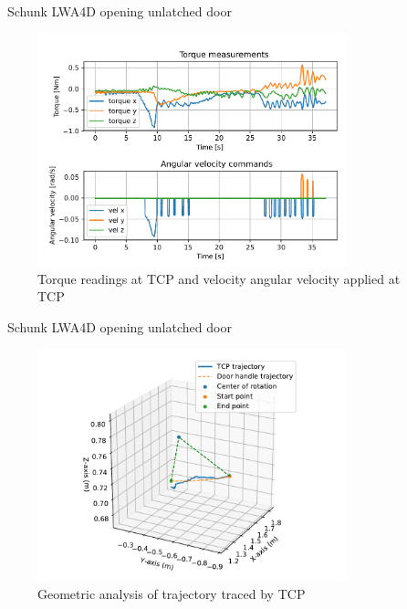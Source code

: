 \documentclass[aspectratio=43,10pt,fleqn,t]{beamer}
\begin{document}
\begin{frame}{~}{\small Schunk LWA4D opening unlatched door}
	\vspace{-1cm}
	\begin{figure}[t]
		\centering
		\includegraphics[width=0.8\textwidth]{images/exp/t-wn.pdf}
		\caption{Torque readings at TCP and velocity angular velocity applied at TCP}
		\label{EX:t-w}
	\end{figure}
\end{frame}

\begin{frame}{~}{\small Schunk LWA4D opening unlatched door}
	\vspace{-1cm}
	\begin{figure}[t]
		\centering
		\includegraphics[width=0.8\textwidth]{images/exp/traj.pdf}
		\caption{Geometric analysis of trajectory traced by TCP}
		\label{EX:traj}
	\end{figure}
\end{frame}
\end{document}
